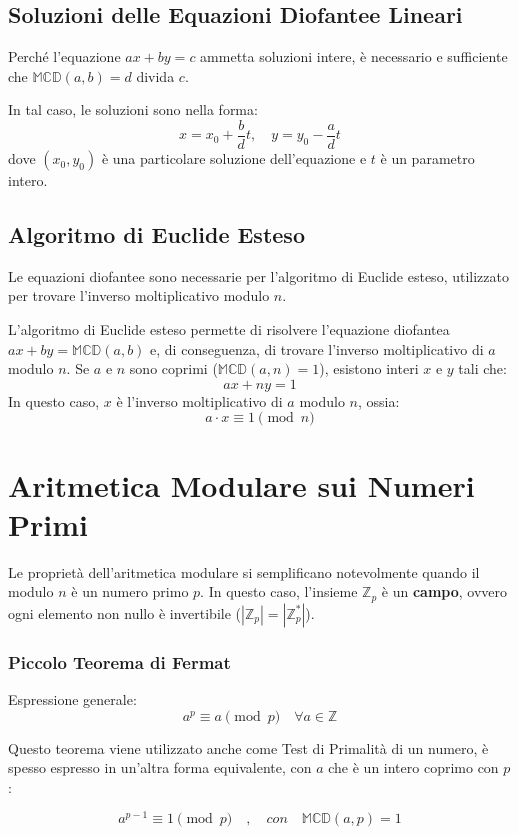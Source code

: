 \documentclass[a4paper,12pt]{report}
\begin{document}
\subsection*{Soluzioni delle Equazioni Diofantee Lineari}
Perché l'equazione $ax + by = c$ ammetta soluzioni intere, è necessario e sufficiente che $\mathbb{MCD}(a, b) = d$ divida $c$. 

In tal caso, le soluzioni sono nella forma:
\[x = x_0 + \frac{b}{d}t, \quad y = y_0 - \frac{a}{d}t\]
dove $(x_0, y_0)$ è una particolare soluzione dell'equazione e $t$ è un parametro intero.

\subsection*{Algoritmo di Euclide Esteso}
Le equazioni diofantee sono necessarie per l'algoritmo di Euclide esteso, utilizzato per trovare l'inverso moltiplicativo modulo $n$.

L'algoritmo di Euclide esteso permette di risolvere l'equazione diofantea $ax + by = \mathbb{MCD}(a, b)$ e, di conseguenza, di trovare l'inverso moltiplicativo di $a$ modulo $n$. Se $a$ e $n$ sono coprimi ($\mathbb{MCD}(a, n) = 1$), esistono interi $x$ e $y$ tali che:
\[ax + ny = 1\]
In questo caso, $x$ è l'inverso moltiplicativo di $a$ modulo $n$, ossia:
\[a \cdot x \equiv 1 \pmod{n}\]

\section{Aritmetica Modulare sui Numeri Primi}

Le proprietà dell'aritmetica modulare si semplificano notevolmente quando il modulo $n$ è un numero primo $p$. In questo caso, l'insieme $\mathbb{Z}_p$ è un \textbf{campo}, ovvero ogni elemento non nullo è invertibile (\( |\mathbb{Z}_p| =|\mathbb{Z}_p^*| \)).

\subsubsection*{Piccolo Teorema di Fermat}
Espressione generale:
$$a^p \equiv a \pmod{p} \quad \forall a \in \mathbb{Z}$$

Questo teorema viene utilizzato anche come Test di Primalità di un numero, è spesso espresso in un'altra forma equivalente, con \(a\) che è un intero coprimo con \(p\):

\[a^{p-1} \equiv 1 \pmod{p}\quad,\quad con\quad \mathbb{MCD}(a,p)=1\]
\end{document}
